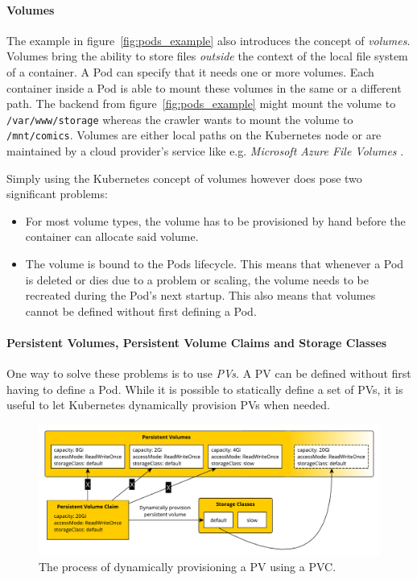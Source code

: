 \paragraph{Volumes}%
\label{par:Volumes}

The example in figure~\ref{fig:pods_example} also introduces the concept of
\textit{volumes}. Volumes bring the ability to store files \textit{outside} the
context of the local file system of a container. A Pod can specify that it
needs one or more volumes. Each container inside a Pod is able to mount these
volumes in the same or a different path. The backend from
figure~\ref{fig:pods_example} might mount the volume to
\texttt{/var/www/storage} whereas the crawler wants to mount the volume to
\texttt{/mnt/comics}. Volumes are either local paths on the Kubernetes node or
are maintained by a cloud provider's service like e.g. \textit{Microsoft Azure
File Volumes} \autocite[Ch. 6]{LuksaKubernetesAction2017}.

Simply using the Kubernetes concept of volumes however does pose two significant problems:
\begin{itemize}
  \item For most volume types, the volume has to be provisioned by hand before
    the container can allocate said volume.
  \item The volume is bound to the Pods lifecycle. This means that whenever a
    Pod is deleted or dies due to a problem or scaling, the volume needs
    to be recreated during the Pod's next startup. This also means that volumes
    cannot be defined without first defining a Pod.
\end{itemize}

\paragraph{Persistent Volumes, Persistent Volume Claims and Storage Classes}%
\label{par:Persistent_Volume_Claims_and_Storage_Classes}
One way to solve these problems is to use \textit{\acfp{PV}}. A \ac{PV} can be
defined without first having to define a Pod. While it is possible to
statically define a set of \acp{PV}, it is useful to let Kubernetes dynamically
provision \acp{PV} when needed.

\begin{figure}[H]
\begin{center}
  \includegraphics[scale=0.5]{images/figures/pvs.pdf}
\end{center}
\caption{The process of dynamically provisioning a \acf{PV} using a \acf{PVC}.}%
\label{fig:dynamic_pvs}
\end{figure}

